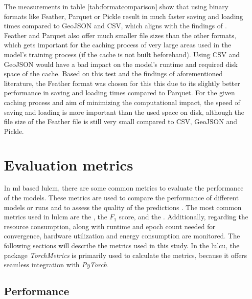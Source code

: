 The measurements in table \ref{tab:formatcomparison} show that using binary formats like Feather, Parquet or Pickle result in much faster saving and loading times compared to GeoJSON and CSV, which aligns with the findings of \textcite{Rangaraj.ShobanaDevi.ea2022,Zaitsev2019}. Feather and Parquet also offer much smaller file sizes than the other formats, which gets important for the caching process of very large areas used in the model's training process (if the cache is not built beforehand). Using CSV and GeoJSON would have a bad impact on the model's runtime and required disk space of the cache. Based on this test and the findings of aforementioned literature, the Feather format was chosen for this this due to its slightly better performance in saving and loading times compared to Parquet. For the given caching process and aim of minimizing the computational impact, the speed of saving and loading is more important than the used space on disk, although the file size of the Feather file is still very small compared to CSV, GeoJSON and Pickle.

\section{Evaluation metrics}
\label{subsec:metrics}

In \gls{ml} based \gls{lulcm}, there are some common metrics to evaluate the performance of the models. These metrics are used to compare the performance of different models or runs and to assess the quality of the predictions \autocite{Moharram.Sundaram2023,Zhao.Tu.ea2023}. The most common metrics used in \gls{lulcm} are the , the \( F_{1} \) score, and the . Additionally, regarding the resource consumption, along with runtime and epoch count needed for convergence, hardware utilization and energy consumption are monitored. The following sections will describe the metrics used in this study. In the \gls{lulcu}, the package \emph{TorchMetrics} \autocite{Torchmetrics2024} is primarily used to calculate the metrics, because it offers seamless integration with \emph{PyTorch}.

\subsection{Performance}

